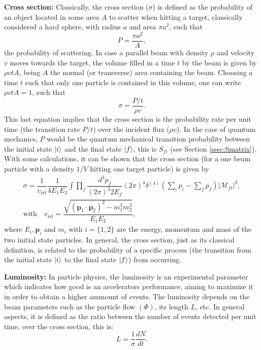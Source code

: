 \textbf{Cross section:} Classically, the cross section ($\sigma$) is defined as the probability of an object located in some area $A$ to scatter when hitting a target, classically considered a hard sphere, with radius $a$ and area $\pi a^2$, such that
\begin{equation*}
    P = \dfrac{\pi a^2}{A},
\end{equation*}
the probability of scattering. In case a parallel beam with density $\rho$ and velocity $v$ moves towards the target, the volume filled in a time $t$ by the beam is given by $\rho v t A$, being $A$ the normal (or transverse) area containing the beam. Choosing a time $t$ such that only one particle is contained in this volume, one can write $\rho v t A = 1$, such that
\begin{equation*}
    \sigma = \dfrac{P/t}{\rho v}.
\end{equation*}
This last equation implies that the cross section is the probability rate per unit time (the transition rate $P/t$) over the incident flux ($\rho v$). In the case of quantum mechanics, $P$ would be the quantum mechanical transition probability between the initial state $\ket{i}$ and the final state $\ket{f}$, this is $S_{fi}$ (see Section \ref{ssec:Smatrix}). With some calculations, it can be shown that the cross section (for a one beam particle with a density $1/V$ hitting one target particle) is given by \cite{Lahiri}
\begin{gather*}
    \sigma = \dfrac{1}{v_{\textrm{rel}}}\dfrac{1}{4E_1 E_2} \int \prod_{f} \dfrac{d^3p_f}{(2\pi)^3 2E_f} (2\pi)^4 \delta^{(4)}\left( \sum_i p_i - \sum_f p_f \right) |\mathcal{M}_{fi}|^2, \\
    \textrm{with} \quad v_{\textrm{rel}} = \dfrac{\sqrt{(\bm{p}_1\cdot\bm{p}_2)^2 - m_1^2m_2^2}}{E_1E_2},
\end{gather*}
where $E_i, \bm{p}_i$ and $m_i$ with $i=\{1,2\}$ are the energy, momentum and mass of the two initial state particles. In general, the cross section, just as its classical definition, is related to the probability of a specific process (the transition from the initial state $\ket{i}$ to the final state $\ket{f}$) from occurring.

\textbf{Luminosity:} In particle physics, the luminosity is an experimental parameter which indicates how good is an accelerators performance, aiming to maximize it in order to obtain a higher ammount of events. The luminosity depends on the beam parameters such as the particle flow $(\Phi)$, its length $L$, etc. In general aspects, it is defined as the ratio between the number of events detected per unit time, over the cross section, this is:
\begin{equation*}
    L = \dfrac{1}{\sigma}\dfrac{dN}{dt}.
\end{equation*}

